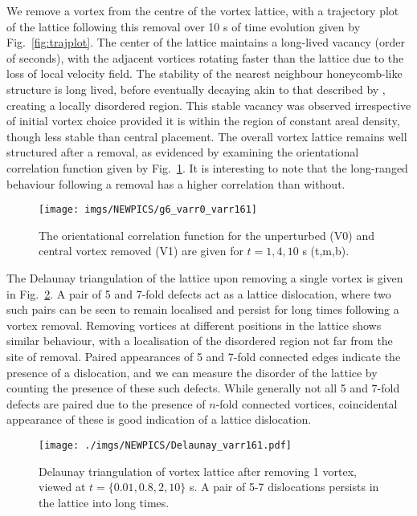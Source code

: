 We remove a vortex from the centre of the vortex lattice, with a trajectory plot of the lattice following this removal over 10 s of time evolution given by Fig.~\ref{fig:trajplot}. The center of the lattice maintains a long-lived vacancy (order of seconds), with the adjacent vortices rotating faster than the lattice due to the loss of local velocity field. The stability of the nearest neighbour honeycomb-like structure is long lived, before eventually decaying akin to that described by \cite{Vtx:Leipold_jsm_2016}, creating a locally disordered region. This stable vacancy was observed irrespective of initial vortex choice provided it is within the region of constant areal density, though less stable than central placement. The overall vortex lattice remains well structured after a removal, as evidenced by examining the orientational correlation function given by Fig.~\ref{fig:g6}. It is interesting to note that the long-ranged behaviour following a removal has a higher correlation than without.

\begin{figure}[tb]
    \texttt{[image: imgs/NEWPICS/g6\_varr0\_varr161]}
    \caption{The orientational correlation function for the unperturbed (V0) and central vortex removed (V1) are given for $t={1,4,10}$ s (t,m,b).}\label{fig:g6}
\end{figure}

The Delaunay triangulation of the lattice upon removing a single vortex is given in Fig.~\ref{fig:deltri_1vtx}. A pair of 5 and 7-fold defects act as a lattice dislocation, where two such pairs can be seen to remain localised and persist for long times following a vortex removal. Removing vortices at different positions in the lattice shows similar behaviour, with a localisation of the disordered region not far from the site of removal. Paired appearances of 5 and 7-fold connected edges indicate the presence of a dislocation, and we can measure the disorder of the lattice by counting the presence of these such defects. While generally not all 5 and 7-fold defects are paired due to the presence of $n$-fold connected vortices, coincidental appearance of these is good indication of a lattice dislocation.

\begin{figure}[bt]
    \texttt{[image: ./imgs/NEWPICS/Delaunay\_varr161.pdf]}
    \caption{Delaunay triangulation of vortex lattice after removing 1 vortex, viewed at $t=\{0.01,0.8,2,10\}$ s. A pair of 5-7 dislocations persists in the lattice into long times.}\label{fig:deltri_1vtx}
\end{figure}

